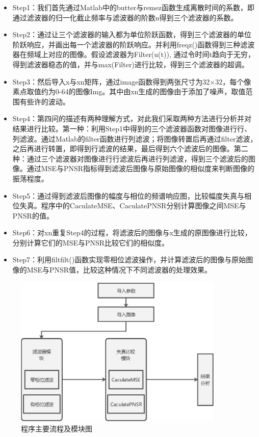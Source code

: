 \documentclass{article}
\begin{document}
\begin{itemize}
 

   \item Step1：我们首先通过Matlab中的butter与remez函数生成离散时间的系数，即通过滤波器的归一化截止频率与滤波器的阶数n得到三个滤波器的系数。


   \item Step2：通过让三个滤波器的输入都为单位阶跃函数，得到三个滤波器的单位阶跃响应，并画出每一个滤波器的阶跃响应。并利用freqz()函数得到三种滤波器在频域上对应的图像。假设滤波器为Filter(u(t)), 通过令时间t趋向于无穷，得到滤波器稳态的值，并与max(Filter)进行比较，得到三个滤波器的超调。


   \item Step3：然后导入x与xn矩阵，通过image函数得到两张尺寸为32×32，每个像素点取值约为0-64的图像Img。其中由xn生成的图像由于添加了噪声，取值范围有些许的波动。


   \item Step4：第四问的描述有两种理解方式，对此我们采取两种方法进行分析并对结果进行比较。第一种：利用Step1中得到的三个滤波器函数对图像进行行、列滤波。通过Matlab的filter函数进行列滤波；将图像转置后再通过filter滤波，之后再进行转置，即得到行滤波的结果，最后得到六个滤波后的图像。第二种：通过三个滤波器对图像进行行滤波后再进行列滤波，得到三个滤波后的图像。通过MSE与PNSR指标得到滤波后图像与原始图像的相似度来判断图像的振荡程度。


   \item Step5：通过得到滤波后图像的幅度与相位的频谱响应图，比较幅度失真与相位失真。程序中的CaculateMSE、CaculatePNSR分别计算图像之间MSE与PNSR的值。


   \item Step6：对xn重复Step4的过程，将滤波后的图像与x生成的原图像进行比较，分别计算它们的MSE与PNSR比较它们的相似度。

   \item Step7：利用filtfilt()函数实现零相位滤波操作，并计算滤波后的图像与原始图像的MSE与PNSR值，比较这种情况下不同滤波器的处理效果。
\end{itemize}
\begin{figure}[h]
    \centering
    \includegraphics[width=10cm]{flowchart.eps}
    \caption{程序主要流程及模块图}
    \label{fig:flowchart}
\end{figure}
\end{document}
